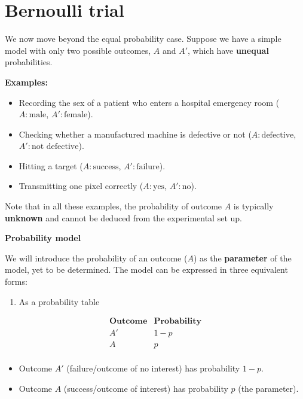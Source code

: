 \documentclass[
]{book}
\providecommand{\tightlist}{%
  \setlength{\itemsep}{0pt}\setlength{\parskip}{0pt}}
\begin{document}
\hypertarget{bernoulli-trial}{%
\section{Bernoulli trial}\label{bernoulli-trial}}

We now move beyond the equal probability case. Suppose we have a simple model with only two possible outcomes, \(A\) and \(A'\), which have \textbf{unequal} probabilities.

\textbf{Examples:}

\begin{itemize}
\item
  Recording the sex of a patient who enters a hospital emergency room (\(A: \text{male}\), \(A': \text{female}\)).
\item
  Checking whether a manufactured machine is defective or not (\(A: \text{defective}\), \(A': \text{not defective}\)).
\item
  Hitting a target (\(A: \text{success}\), \(A': \text{failure}\)).
\item
  Transmitting one pixel correctly (\(A: \text{yes}\), \(A': \text{no}\)).
\end{itemize}

Note that in all these examples, the probability of outcome \(A\) is typically \textbf{unknown} and cannot be deduced from the experimental set up.

\textbf{Probability model}

We will introduce the probability of an outcome (\(A\)) as the \textbf{parameter} of the model, yet to be determined. The model can be expressed in three equivalent forms:

\begin{enumerate}
\def\labelenumi{\arabic{enumi})}
\tightlist
\item
  As a probability table
\end{enumerate}

\[
\begin{array}{cc}
\textbf{Outcome} & \textbf{Probability} \\
A' & 1 - p \\
A & p \\
\end{array}
\]

\begin{itemize}
\tightlist
\item
  Outcome \(A'\) (failure/outcome of no interest) has probability \(1 - p\).\\
\item
  Outcome \(A\) (success/outcome of interest) has probability \(p\) (the parameter).
\end{itemize}
\end{document}
